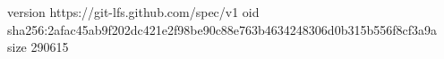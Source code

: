version https://git-lfs.github.com/spec/v1
oid sha256:2afac45ab9f202dc421e2f98be90c88e763b4634248306d0b315b556f8cf3a9a
size 290615

